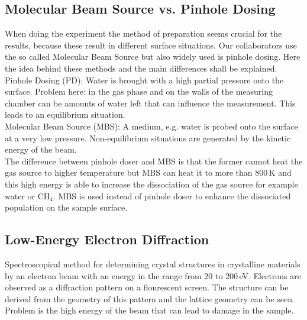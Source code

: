 \documentclass[11pt,DIV=13,BCOR=5mm,a4paper,headinclude]{scrbook}
\newcommand\todo[1]{\textcolor{red}{TODO: \textit{{#1}}}}
\begin{document}
\subsection{Molecular Beam Source vs. Pinhole Dosing}
When doing the experiment the method of preparation seems crucial for the results, because these result in different surface situations.
Our collaborators use the so called Molecular Beam Source but also widely used is pinhole dosing.
Here the idea behind these methods and the main differences shall be explained.
\\
Pinhole Dosing (PD): Water is brought with a high partial pressure onto the surface.
Problem here: in the gas phase and on the walls of the measuring chamber can be amounts of water left that can influence the measurement.
This leads to an equilibrium situation.
\\
Molecular Beam Source (MBS): A medium, e.g. water is probed onto the surface at a very low pressure.
Non-equilibrium situations are generated by the kinetic energy of the beam.
\\
The difference between pinhole doser and MBS is that the former cannot heat the gas source to higher temperature but MBS can heat it to more than $800\,$K and this high energy is able to increase the dissociation of the gas source for example water or CH$_4$.
MBS is used instead of pinhole doser to enhance the dissociated population on the sample surface.

\subsection{Low-Energy Electron Diffraction}
Spectroscopical method for determining crystal structures in crystalline materials by an electron beam with an energy in the range from $20$ to $200\,$eV.
Electrons are observed as a diffraction pattern on a flourescent screen.
The structure can be derived from the geometry of this pattern and the lattice geometry can be seen.
Problem is the high energy of the beam that can lead to damage in the sample.
\def\thefigure{B.\arabic{figure}}
\def\thetable{B.\arabic{table}}
\end{document}
